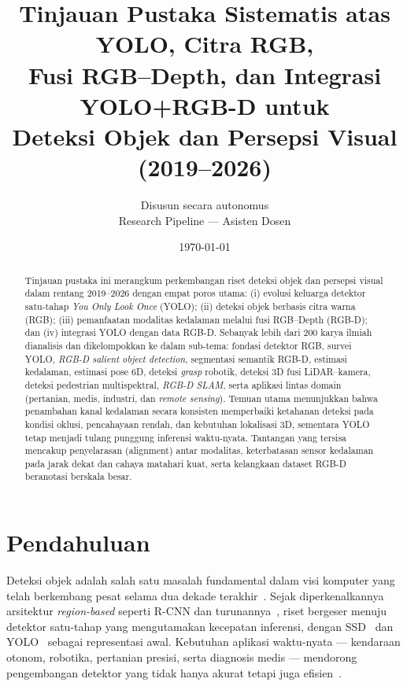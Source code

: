 \documentclass[11pt,a4paper]{article}
\title{\textbf{Tinjauan Pustaka Sistematis atas YOLO, Citra RGB, \\
Fusi RGB--Depth, dan Integrasi YOLO+RGB-D untuk \\
Deteksi Objek dan Persepsi Visual (2019--2026)}}
\author{Disusun secara autonomus\\ \small Research Pipeline --- Asisten Dosen}
\date{\today}
\begin{document}
\maketitle

\begin{abstract}
\noindent
Tinjauan pustaka ini merangkum perkembangan riset deteksi objek dan persepsi
visual dalam rentang 2019--2026 dengan empat poros utama: (i) evolusi keluarga
detektor satu-tahap \emph{You Only Look Once} (YOLO); (ii) deteksi objek berbasis
citra warna (RGB); (iii) pemanfaatan modalitas kedalaman melalui fusi RGB--Depth
(RGB-D); dan (iv) integrasi YOLO dengan data RGB-D. Sebanyak lebih dari 200 karya
ilmiah dianalisis dan dikelompokkan ke dalam sub-tema: fondasi detektor RGB,
survei YOLO, \emph{RGB-D salient object detection}, segmentasi semantik RGB-D,
estimasi kedalaman, estimasi pose 6D, deteksi \emph{grasp} robotik, deteksi 3D
fusi LiDAR--kamera, deteksi pedestrian multispektral, \emph{RGB-D SLAM}, serta
aplikasi lintas domain (pertanian, medis, industri, dan \emph{remote sensing}).
Temuan utama menunjukkan bahwa penambahan kanal kedalaman secara konsisten
memperbaiki ketahanan deteksi pada kondisi oklusi, pencahayaan rendah, dan
kebutuhan lokalisasi 3D, sementara YOLO tetap menjadi tulang punggung inferensi
waktu-nyata. Tantangan yang tersisa mencakup penyelarasan (alignment) antar
modalitas, keterbatasan sensor kedalaman pada jarak dekat dan cahaya matahari
kuat, serta kelangkaan dataset RGB-D beranotasi berskala besar.
\end{abstract}

\tableofcontents
\newpage

\section{Pendahuluan}
Deteksi objek adalah salah satu masalah fundamental dalam visi komputer yang
telah berkembang pesat selama dua dekade terakhir~\cite{zou2023objectdetectionsurvey}.
Sejak diperkenalkannya arsitektur \emph{region-based} seperti R-CNN dan
turunannya~\cite{girshick2014rcnn,girshick2015fastrcnn,ren2017fasterrcnn}, riset
bergeser menuju detektor satu-tahap yang mengutamakan kecepatan inferensi, dengan
SSD~\cite{liu2016ssd} dan YOLO~\cite{redmon2016yolo} sebagai representasi awal.
Kebutuhan aplikasi waktu-nyata --- kendaraan otonom, robotika, pertanian presisi,
serta diagnosis medis --- mendorong pengembangan detektor yang tidak hanya akurat
tetapi juga efisien~\cite{terven2023yolo,jiang2022yoloreview}.
\end{document}
